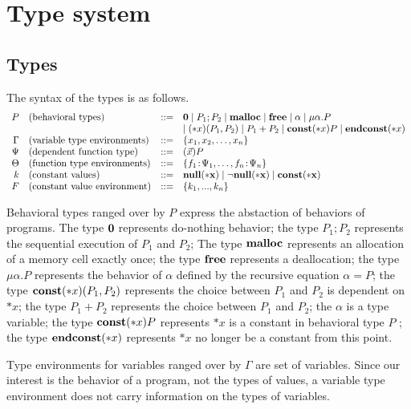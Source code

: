 \section{Type system}
\label{sec:typesystem}

\subsection{Types}
The syntax of the types is as follows.
\[
\begin{array}{rlcl}
  P & (\mbox{behavioral types})&::=& {\bf 0} \mid P_{1};P_{2}  \mid \mathbf{malloc} \mid \mathbf{free} \mid \alpha \mid \mu\alpha.P \\
  &  &  & \mid (*x)(P_1,P_2) \mid P_1 + P_2 \mid \mathbf{const}(*x) P  \mid \mathbf{endconst}(*x)\\
  \Gamma & (\mbox{variable type environments}) &::=& \{x_1, x_2, \dots, x_n\}\\
  \Psi & (\mbox{dependent function type}) &::=& (\vec{x})P\\
  \Theta & (\mbox{function type environments}) &::=& \{f_1\!:\! \Psi_1,\dots,f_n\!:\! \Psi_n\}\\
  k & (\mbox{constant values}) &::=& \bf{null}(*x) \mid \neg\bf{null}(*x) \mid \mathbf{const}(*x)   \\
  F & (\mbox{constant value environment}) &::=& \{k_1,...,k_n\} \\
\end{array}
\]

Behavioral types ranged over by \(P\) express the abstaction of
behaviors of programs. The type \({\bf 0}\) represents do-nothing
behavior; the type \(P_1;P_2\) represents the sequential execution of
\(P_1\) and \(P_2\); The type \(\mathbf{malloc}\) represents an allocation of
a memory cell exactly once; the type \(\mathbf{free}\) represents a
deallocation; the type \(\mu \alpha.P\) represents the behavior of
\(\alpha\) defined by the recursive equation \(\alpha = P\); the type
\(\mathbf{const}(*x)(P_1,P_2)\) represents the choice between \(P_1\) and
\(P_2\) is dependent on \(*x\); the type \(P_1 + P_2\) represents the
choice between \(P_1\) and \(P_2\); the \(\alpha\) is a type variable;
the type \(\mathbf{const}(*x) P\) represents \(*x\) is a constant in
behavioral type \(P\) ; the type \(\mathbf{endconst}(*x)\) represents \(*x\) no
longer be a constant from this point.

Type environments for variables ranged over by \(\Gamma\) are set of
variables.  Since our interest is the behavior of a program, not the
types of values, a variable type environment does not carry
information on the types of variables.

